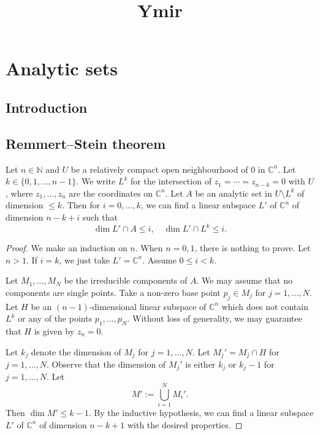 
\title{Ymir}

\maketitle
\tableofcontents

\chapter*{Analytic sets}\label{chap-AS}

\section{Introduction}\label{sec-introduction-AS}

\section{Remmert--Stein theorem}


\begin{lemma}\label{lma-generichypplaneintdimupp}
    Let $n\in \mathbb{N}$ and $U$ be a relatively compact open neighbourhood of $0$ in $\mathbb{C}^n$. Let $k\in \{0,1,\ldots,n-1\}$. We write $L^k$ for the intersection of $z_1=\cdots=z_{n-k}=0$ with $U$, where $z_1,\ldots,z_n$ are the coordinates on $\mathbb{C}^n$. Let $A$ be an analytic set in $U\setminus L^k$ of dimension $\leq k$. Then for $i=0,\ldots,k$, we can find a linear subspace $L'$ of $\mathbb{C}^n$ of dimension $n-k+i$ such that 
    \[
        \dim L'\cap A\leq i,\quad \dim L'\cap L^k\leq i.  
    \]
 \end{lemma}
 \begin{proof}
    We make an induction on $n$. When $n=0,1$, there is nothing to prove. Let $n>1$. If $i=k$, we just take $L'=\mathbb{C}^n$. 
    Assume $0\leq i<k$.

    Let $M_1,\ldots,M_N$ be the irreducible components of $A$. We may assume that no components are single points.
    Take a non-zero base point $p_j\in M_j$ for $j=1,\ldots,N$. Let $H$ be an $(n-1)$-dimensional linear subspace of $\mathbb{C}^n$ which does not contain $L^k$ or any of the points $p_1,\ldots,p_N$. Without loss of generality, we may guarantee that $H$ is given by $z_n=0$.

    Let $k_j$ denote the dimension of $M_j$ for $j=1,\ldots,N$. Let $M_j'=M_j\cap H$ for $j=1,\ldots,N$. Observe that the dimension of $M_j'$ is either $k_j$ or $k_j-1$ for $j=1,\ldots,N$. Let 
    \[
        M':=\bigcup_{i=1}^N M_i'.  
    \]
    Then $\dim M'\leq k-1$.
    By the inductive hypothesis, we can find a linear subspace $L'$ of $\mathbb{C}^n$ of dimension $n-k+1$ with the desired properties.
 \end{proof}

